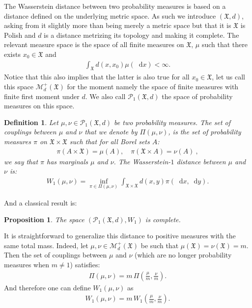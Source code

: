 \documentclass[11pt,a4paper]{article}
\newcommand{\MC}{\mathcal{M}}
\newcommand{\XF}{\mathfrak{X}}
\newcommand{\dd}{\mathop{}\!\mathrm{d}}
\newtheorem{proposition}[theorem]{Proposition}
\newtheorem{definition}[theorem]{Definition}
\begin{document}
The Wasserstein distance between two probability measures is based on a distance defined on the underlying metric space. As such we introduce $(\XF,d)$, asking from it slightly more than being merely a metric space but that it is $\XF$ is Polish and $d$ is a distance metrizing its topology and making it complete. The relevant measure space is the space of all finite measures on $\XF$, $\mu$ such that there exists $x_0 \in \XF$ and 
\begin{align*}
    \int_{\XF} d(x,x_0) \mu(\dd x) < \infty.
\end{align*}
Notice that this also implies that the latter is also true for all $x_0 \in \XF$, let us call this space $\MC^+_d(\XF)$ for the moment namely the space of finite measures with finite first moment under $d$. We also call $\mathcal{P}_1(\XF,d)$ the space of probability measures on this space.
\begin{definition}\label{def:Wasserstein}
    Let $\mu,\nu \in \mathcal{P}_1(\XF,d)$ be two probability measures. The set of couplings between $\mu$ and $\nu$ that we denote by $\Pi(\mu,\nu)$, is the set of probability measures $\pi$ on $\XF\times \XF$ such that for all Borel sets $A$:
    \begin{align*}
        \pi(A\times\XF) = \mu(A) ,\quad  \pi(\XF\times A) = \nu(A)\ ,
    \end{align*}
    we say that $\pi$ has marginals $\mu$ and $\nu$. The Wasserstein-$1$ distance between $\mu$ and $\nu$ is:
    \begin{align*}
        W_1(\mu,\nu) = \inf\limits_{\pi \in\Pi(\mu,\nu)} \int_{\XF\times \XF} d(x,y) \pi(\dd x,\dd y).
    \end{align*}
\end{definition}
And a classical result \cite{villani2008optimal,santambrogio2015optimal,piccoli2016properties} is:
\begin{proposition}
    The space $\left( \mathcal{P}_1(\XF,d),W_1\right) $ is complete.
\end{proposition}
It is straightforward to generalize this distance to positive measures with the same total mass. Indeed, let $\mu, \nu \in \MC^+_d(\XF)$ be such that $\mu(\XF) = \nu(\XF) = m$. Then the set of couplings between $\mu$ and $\nu$ (which are no longer probability measures when $m \neq 1$) satisfies:
\begin{align*}
    \Pi(\mu,\nu) = m \, \Pi\left(\frac{\mu}{m}, \frac{\nu}{m}\right).
\end{align*}
And therefore one can define $W_1(\mu,\nu)$ as
\begin{align*}
    W_1(\mu,\nu) = m\, W_1\left( \frac{\mu}{m}, \frac{\nu}{m}\right).
\end{align*}
\end{document}
